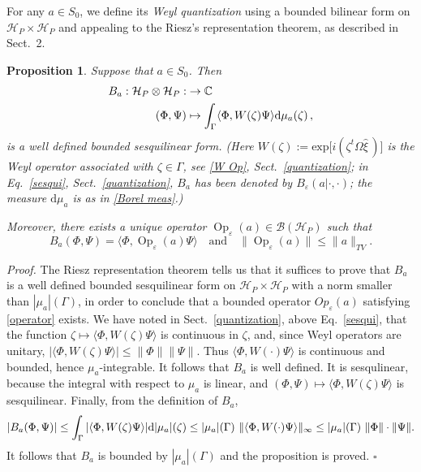 \documentclass[11pt]{article}
\DeclareMathOperator{\Op}{Op}
\newcommand{\cc}{\mathbb{C}}
\renewcommand{\d}{{\rm d}}
\newtheorem{proposition}[theorem]{Proposition}
\begin{document}
For any $a\in S_0$, we define its \textit{Weyl quantization} using a bounded bilinear form on 
$\mathcal H_P \times \mathcal H_P$ and appealing to the Riesz's representation theorem, as 
described in Sect.~2.
\begin{proposition}\label{prop:def_quantization}
Suppose that $a\in S_0$. Then 
\begin{align*}
	B_a:\mathcal H_P\otimes \mathcal H_P:&\to \cc\\
	(\Phi,\Psi)&\mapsto \int_\Gamma\langle\Phi,W(\zeta)\Psi\rangle \d \mu_a(\zeta)\,,
\end{align*}
is a well defined bounded sesquilinear form. (Here $W(\zeta) :=\text{exp}\big[i(\zeta^{t}\Omega \hat{\xi}\,)\big]$ is
the Weyl operator associated with $\zeta \in \Gamma$, see \eqref{W Op}, Sect.~\ref{quantization}; in Eq.~\eqref{sesqui}, Sect.~\ref{quantization}, $B_a$ has been denoted by $B_{\varepsilon}(a |\cdot, \cdot)$; the measure $ \text{d}\mu_a$ 
is as in \eqref{Borel meas}.)

Moreover, there exists a unique operator $\Op_\varepsilon(a)\in \mathcal B(\mathcal H_P)$ such that
\begin{equation}\label{operator}
B_a(\Phi,\Psi)=\langle\Phi,\Op_{\varepsilon}(a)\Psi\rangle\quad \mbox{and}\quad \|\Op_\varepsilon(a)\|\leq \|a\|_{TV}.
\end{equation}
\end{proposition}
\textit{Proof.} The Riesz representation theorem tells us that it suffices to prove that $B_a$ is a well defined bounded sesquilinear 
form on $\mathcal H_P\times \mathcal H_P$ with a norm smaller than $|\mu_a|(\Gamma)$, in order to conclude that 
a bounded operator $Op_{\varepsilon}(a)$ satisfying \eqref{operator} exists. We have noted in Sect.~\ref{quantization}, 
above Eq.~\eqref{sesqui}, that  the function $\zeta \mapsto \langle\Phi,W(\zeta)\Psi\rangle$ is continuous in 
$\zeta$, and, since Weyl operators are unitary, $|\langle\Phi,W(\zeta)\Psi\rangle|\leq \|\Phi\|\|\Psi\|$. 
Thus $\langle\Phi,W(\cdot)\Psi\rangle$ is continuous and bounded,
hence $\mu_a$-integrable. It follows that $B_a$ is well defined. It is sesqulinear, because the integral with respect 
to $\mu_a$ is linear, and $(\Phi,\Psi)\mapsto \langle\Phi,W(\zeta)\Psi\rangle$ is sesquilinear. 
Finally, from the definition of $B_a$,
$$|B_a(\Phi,\Psi)|\leq\int_\Gamma|\langle\Phi,W(\zeta)\Psi\rangle|\d|\mu_a|(\zeta)\leq |\mu_a|(\Gamma)\  \|\langle\Phi,W(\cdot)\Psi\rangle\|_\infty\leq |\mu_a|(\Gamma)\ \|\Phi\| \cdot \|\Psi\|.$$
It follows that $B_a$ is bounded by $|\mu_a|(\Gamma)$ and the proposition is proved.  \hfill{$\square$}
\end{document}
